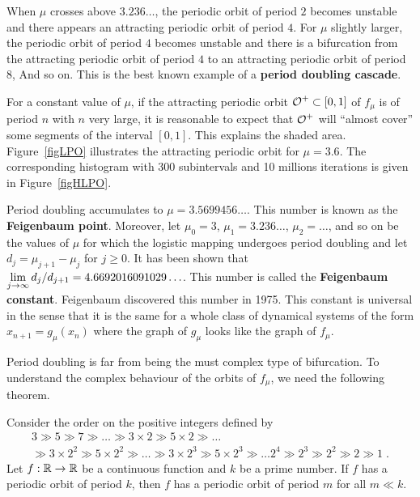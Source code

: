 When $\mu$ crosses above $3.236\ldots$, the periodic orbit of period $2$
becomes unstable and there appears an attracting periodic orbit of
period $4$.  For $\mu$ slightly larger, the periodic orbit of period
$4$ becomes unstable and there is a bifurcation from the attracting
periodic orbit of period $4$ to an attracting periodic orbit of period
$8$, And so on.  This is the best known example of a
{\bfseries period doubling cascade}.

For a constant value of $\mu$, if the attracting periodic orbit
$\displaystyle \mathcal{O}^+ \subset [0,1]$ of $f_\mu$ is of period $n$ with
$n$ very large, it is reasonable to expect that
$\displaystyle \mathcal{O}^+$ will ``almost cover'' some segments of the
interval $[0,1]$.  This explains the shaded area. Figure~\ref{figLPO}
illustrates the attracting periodic orbit for $\mu=3.6$.  The
corresponding histogram with 300 subintervals and 10 millions
iterations is given in Figure~\ref{figHLPO}.



Period doubling accumulates to $\mu = 3.5699456\ldots$.  This number
is known as the {\bfseries Feigenbaum point}.
Moreover, let $\mu_0=3$, $\mu_1=3.236\ldots$, $\mu_2 =\ldots$, and so
on be the values of $\mu$ for which the logistic mapping undergoes
period doubling and let $d_j = \mu_{j+1}-\mu_j$ for $j \geq 0$.
It has been shown that
$\displaystyle \lim_{j\rightarrow \infty} d_j/d_{j+1} =
4.6692016091029\ldots$.  This number is called the
{\bfseries Feigenbaum constant}.
Feigenbaum discovered this number in
1975.  This constant is universal in the sense that it is the same
for a whole class of dynamical systems of the form
$x_{n+1} = g_\mu(x_n)$ where the graph of $g_\mu$ looks like the
graph of $f_\mu$.

Period doubling is far from being the must complex type of
bifurcation. To understand the complex behaviour of the orbits of
$f_\mu$, we need the following theorem.

\begin{theorem}[Sarkovskii]
Consider the order on the positive integers defined by
\begin{multline*}
3 \gg 5 \gg 7 \gg \ldots
\gg 3\times 2 \gg 5\times 2 \gg \ldots \\
\gg 3\times 2^2 \gg 5\times 2^2 \gg \ldots
\gg 3\times 2^3 \gg 5\times 2^3 \gg \ldots
2^4 \gg 2^3 \gg 2^2 \gg 2 \gg 1 \; .
\end{multline*}
Let $f:\mathbb{R} \rightarrow \mathbb{R}$ be a continuous function and $k$ be a
prime number.  If $f$ has a periodic orbit of period $k$, then $f$ has
a periodic orbit of period $m$ for all $m \ll k$.
\end{theorem}

